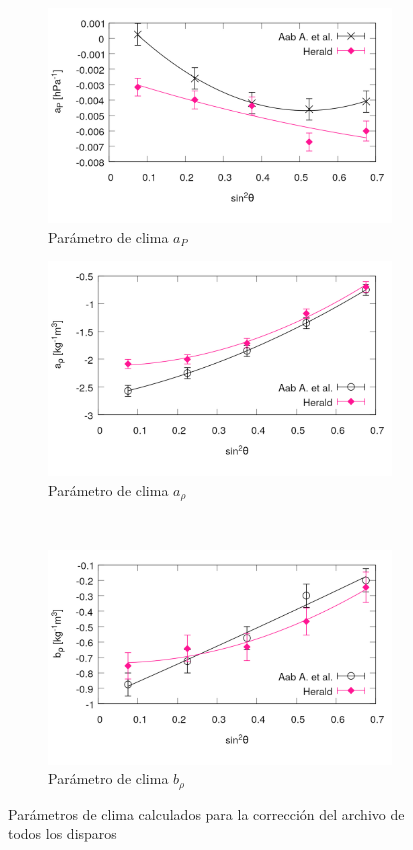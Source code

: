 \begin{figure}[H]
\begin{subfigure}{.5\textwidth}
	\centering
	\includegraphics[width=\linewidth]{ap_6t5.png}
	\caption{Parámetro de clima $a_P$}
\end{subfigure}%
\begin{subfigure}{.5\textwidth}
	\centering
	\includegraphics[width=\linewidth]{arho_6t5.png}
	\caption{Parámetro de clima $a_\rho$}
\end{subfigure}\\
\centering
\begin{subfigure}{.5\textwidth}
	\centering
	\includegraphics[width=\linewidth]{brho_6t5.png}
	\caption{Parámetro de clima $b_\rho$}
\end{subfigure}%
\caption{Parámetros de clima calculados para la corrección del archivo de todos los disparos}
\end{figure}



